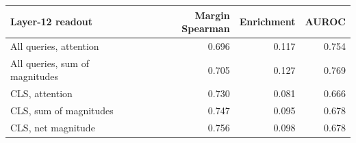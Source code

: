 \begin{tabular}{@{}lrrr@{}}
\toprule
Layer-12 readout & Margin Spearman & Enrichment & AUROC \\
\midrule
All queries, attention & 0.696 & 0.117 & 0.754 \\
All queries, sum of magnitudes & 0.705 & 0.127 & 0.769 \\
CLS, attention & 0.730 & 0.081 & 0.666 \\
CLS, sum of magnitudes & 0.747 & 0.095 & 0.678 \\
CLS, net magnitude & 0.756 & 0.098 & 0.678 \\
\bottomrule
\end{tabular}
